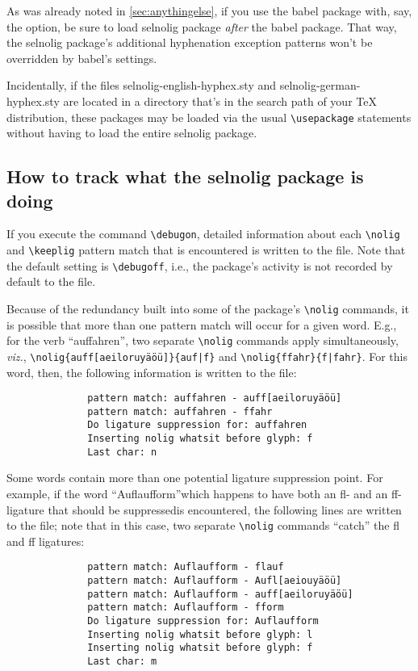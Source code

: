 \documentclass[11pt]{article}
\newcommand{\pkg}[1]{\textsf{#1}}
\newcommand{\opt}[1]{\uselig{\texttt{#1}}}
\newcommand{\cmmd}[1]{\texttt{\textbackslash #1}}
\begin{document}
As was already noted in \cref{sec:anythingelse}, if you use the \pkg{babel} package with, say, the \opt{ngerman} option, be sure to load \pkg{selnolig} package \emph{after} the \pkg{babel} package. That way, the \pkg{selnolig} package's additional hyphenation exception patterns won't be overridden by \pkg{babel}'s settings.

Incidentally, if the files \pkg{selnolig-english-hyphex.sty} and \pkg{selnolig-german-hyphex.sty} are located in a directory that's in the search path of your TeX distribution, these packages may be loaded via the usual \cmmd{usepackage} statements without having to load the entire \pkg{selnolig} package.



\subsection[How to track what the selnolig package is doing]{How to track what the \pkg{selnolig} package is doing} \label{sec:debugon}

If you execute the command \cmmd{debugon}, detailed information about each \cmmd{nolig} and \cmmd{keeplig} pattern match that is encountered is written to the \opt{.log} file. Note that the default setting is \cmmd{debugoff}, i.e., the package's activity is not recorded by default to the \opt{.log} file.


Because of the redundancy built into some of the package's \cmmd{nolig} commands, it is possible that more than one pattern match will occur for a given word. E.g., for the verb \enquote{auffahren}, two separate \cmmd{nolig} commands apply simultaneously, \emph{viz.}, \Verb+\nolig{auff[aeiloruyäöü]}{auf|f}+ and \Verb+\nolig{ffahr}{f|fahr}+. For this word, then, the following information is written to the \opt{.log} file:
\begin{Verbatim}
              pattern match: auffahren - auff[aeiloruyäöü]
              pattern match: auffahren - ffahr
              Do ligature suppression for: auffahren
              Inserting nolig whatsit before glyph: f
              Last char: n
\end{Verbatim}

Some words contain more than one potential ligature suppression point. For example, if the word \enquote{Auflaufform}\textemdash which happens to have both an fl- and an ff-ligature that should be suppressed\textemdash is encountered, the following lines are written to the \opt{.log} file; note that in this case, two separate \cmmd{nolig} commands \enquote{catch} the fl and ff ligatures:
\begin{Verbatim}
              pattern match: Auflaufform - flauf
              pattern match: Auflaufform - Aufl[aeiouyäöü]
              pattern match: Auflaufform - auff[aeiloruyäöü]
              pattern match: Auflaufform - fform
              Do ligature suppression for: Auflaufform
              Inserting nolig whatsit before glyph: l
              Inserting nolig whatsit before glyph: f
              Last char: m
\end{Verbatim}
\end{document}
